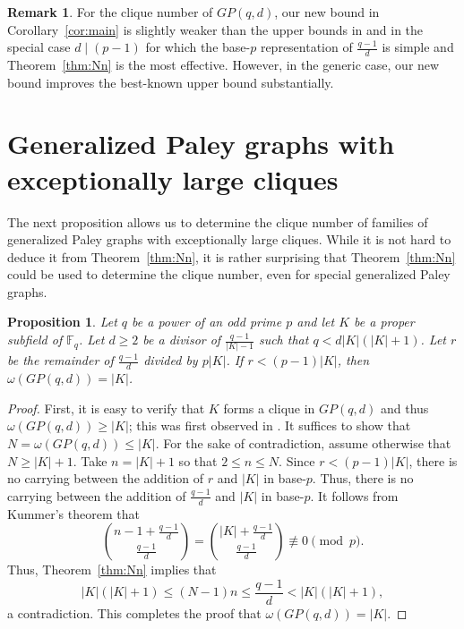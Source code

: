 \documentclass[12pt,reqno]{amsart}
\newtheorem{prop}[thm]{Proposition}
\theoremstyle{definition}
\newtheorem{rem}[thm]{Remark}
\newcommand{\F}{\mathbb{F}}
\begin{document}
\begin{rem}
For the clique number of $GP(q,d)$, our new bound in Corollary~\ref{cor:main} is slightly weaker than the upper bounds in \cite{Yip1} and \cite[Theorem 5.10]{Yip2} in the special case $d \mid (p-1)$ for which the base-$p$ representation of $\frac{q-1}{d}$ is simple and Theorem~\ref{thm:Nn} is the most effective. However, in the generic case, our new bound improves the best-known upper bound \cite[Theorem 6.5]{Yip2} substantially.
\end{rem}


\section{Generalized Paley graphs with exceptionally large cliques}\label{sec:sec4}

The next proposition allows us to determine the clique number of families of generalized Paley graphs with exceptionally large cliques. While it is not hard to deduce it from Theorem~\ref{thm:Nn}, it is rather surprising that Theorem~\ref{thm:Nn} could be used to determine the clique number, even for special generalized Paley graphs.

\begin{prop}\label{prop:cliquenumber2}
Let $q$ be a power of an odd prime $p$ and let $K$ be a proper subfield of $\F_q$. Let $d \geq 2$ be a divisor of $\frac{q-1}{|K|-1}$ such that $q< d|K|(|K|+1)$. Let $r$ be the remainder of $\frac{q-1}{d}$ divided by $p|K|$. If $r<(p-1)|K|$, 
then $\omega(GP(q,d))=|K|$.    
\end{prop}

\begin{proof}
First, it is easy to verify that $K$ forms a clique in $GP(q,d)$ and thus $\omega(GP(q,d)) \geq |K|$; this was first observed in \cite{BDR88}. It suffices to show that $N=\omega(GP(q,d)) \leq |K|$. For the sake of contradiction, assume otherwise that $N \geq |K|+1$. Take $n=|K|+1$ so that $2 \leq n \leq N$. Since $r<(p-1)|K|$, there is no carrying between the addition of $r$ and $|K|$ in base-$p$. Thus, there is no carrying between the addition of $\frac{q-1}{d}$ and $|K|$ in base-$p$. It follows from Kummer's theorem that
$$
\binom{n-1+\frac{q-1}{d}}{\frac{q-1}{d}}=\binom{|K|+\frac{q-1}{d}}{\frac{q-1}{d}} \not \equiv 0 \pmod p.
$$
Thus, Theorem~\ref{thm:Nn} implies that
$$|K|(|K|+1) \leq (N-1)n \leq \frac{q-1}{d}<|K|(|K|+1),$$
a contradiction. This completes the proof that $\omega(GP(q,d))=|K|$.
\end{proof}
\end{document}
